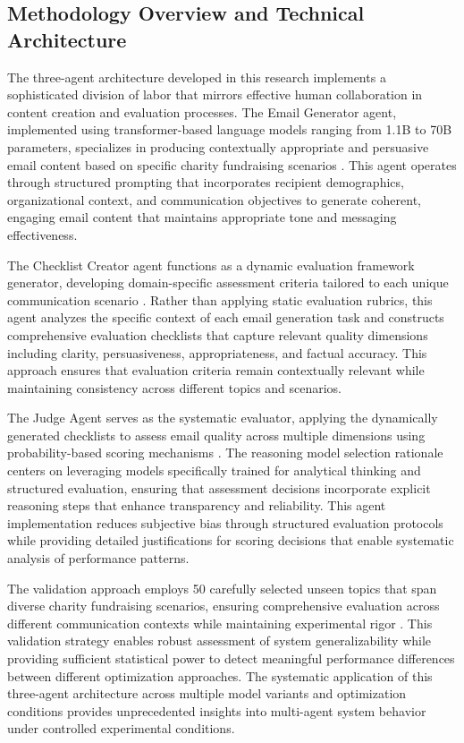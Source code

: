 \subsection{Methodology Overview and Technical Architecture}

The three-agent architecture developed in this research implements a sophisticated division of labor that mirrors effective human collaboration in content creation and evaluation processes. The Email Generator agent, implemented using transformer-based language models ranging from 1.1B to 70B parameters, specializes in producing contextually appropriate and persuasive email content based on specific charity fundraising scenarios \cite{zhou2025ai_agent_communication, ke2025mas_zero}. This agent operates through structured prompting that incorporates recipient demographics, organizational context, and communication objectives to generate coherent, engaging email content that maintains appropriate tone and messaging effectiveness.

The Checklist Creator agent functions as a dynamic evaluation framework generator, developing domain-specific assessment criteria tailored to each unique communication scenario \cite{cheng2024exploring_llm_agents, qiao2022reasoning_prompting}. Rather than applying static evaluation rubrics, this agent analyzes the specific context of each email generation task and constructs comprehensive evaluation checklists that capture relevant quality dimensions including clarity, persuasiveness, appropriateness, and factual accuracy. This approach ensures that evaluation criteria remain contextually relevant while maintaining consistency across different topics and scenarios.

The Judge Agent serves as the systematic evaluator, applying the dynamically generated checklists to assess email quality across multiple dimensions using probability-based scoring mechanisms \cite{hadji2024inference_time_dph, xu2023re_reading_reasoning}. The reasoning model selection rationale centers on leveraging models specifically trained for analytical thinking and structured evaluation, ensuring that assessment decisions incorporate explicit reasoning steps that enhance transparency and reliability. This agent implementation reduces subjective bias through structured evaluation protocols while providing detailed justifications for scoring decisions that enable systematic analysis of performance patterns.

The validation approach employs 50 carefully selected unseen topics that span diverse charity fundraising scenarios, ensuring comprehensive evaluation across different communication contexts while maintaining experimental rigor \cite{gao2024meta_reasoning_prompting, shao2023synthetic_prompting}. This validation strategy enables robust assessment of system generalizability while providing sufficient statistical power to detect meaningful performance differences between different optimization approaches. The systematic application of this three-agent architecture across multiple model variants and optimization conditions provides unprecedented insights into multi-agent system behavior under controlled experimental conditions.

